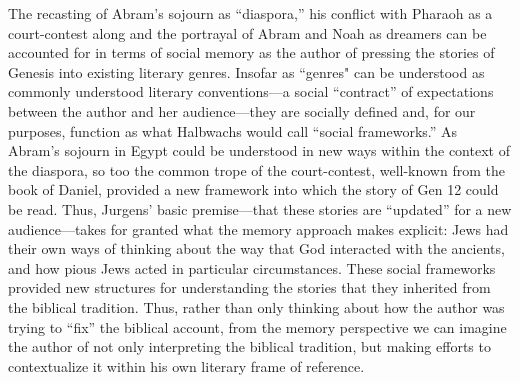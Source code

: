 The recasting of Abram's sojourn as ``diaspora,'' his conflict with Pharaoh as a court-contest along and the portrayal of Abram and Noah as dreamers can be accounted for in terms of social memory as the author of \ga pressing the stories of Genesis into existing literary genres. Insofar as ``genres" can be understood as commonly understood literary conventions---a social ``contract'' of expectations between the author and her audience---they are socially defined and, for our purposes, function as what Halbwachs would call ``social frameworks.'' As Abram's sojourn in Egypt could be understood in new ways within the context of the diaspora, so too the common trope of the court-contest, well-known from the book of Daniel, provided a new framework into which the story of Gen 12 could be read. Thus, Jurgens' basic premise---that these stories are ``updated'' for a new audience---takes for granted what the memory approach makes explicit: \secondtemple Jews had their own ways of thinking about the way that God interacted with the ancients, and how pious Jews acted in particular circumstances. These social frameworks provided new structures for understanding the stories that they inherited from the biblical tradition. Thus, rather than only thinking about how the author was trying to ``fix'' the biblical account, from the memory perspective we can imagine the author of \ga not only interpreting the biblical tradition, but making efforts to contextualize it within his own literary frame of reference.